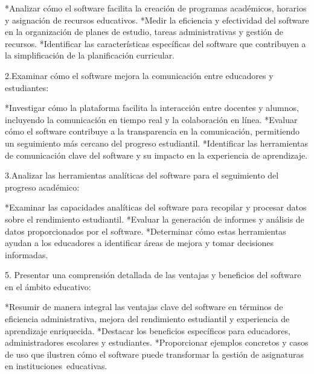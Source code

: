 *Analizar cómo el software facilita la creación de programas académicos, horarios y asignación de recursos educativos.
*Medir la eficiencia y efectividad del software en la organización de planes de estudio, tareas administrativas y gestión de recursos.
*Identificar las características específicas del software que contribuyen a la simplificación de la planificación curricular.

2.Examinar cómo el software mejora la comunicación entre educadores y estudiantes:

*Investigar cómo la plataforma facilita la interacción entre docentes y alumnos, incluyendo la comunicación en tiempo real y la colaboración en línea.
*Evaluar cómo el software contribuye a la transparencia en la comunicación, permitiendo un seguimiento más cercano del progreso estudiantil.
*Identificar las herramientas de comunicación clave del software y su impacto en la experiencia de aprendizaje.

3.Analizar las herramientas analíticas del software para el seguimiento del progreso académico:

*Examinar las capacidades analíticas del software para recopilar y procesar datos sobre el rendimiento estudiantil.
*Evaluar la generación de informes y análisis de datos proporcionados por el software.
*Determinar cómo estas herramientas ayudan a los educadores a identificar áreas de mejora y tomar decisiones informadas.

5. Presentar una comprensión detallada de las ventajas y beneficios del software en el ámbito educativo:

*Resumir de manera integral las ventajas clave del software en términos de eficiencia administrativa, mejora del rendimiento estudiantil
y experiencia de aprendizaje enriquecida.
*Destacar los beneficios específicos para educadores, administradores escolares y estudiantes.
*Proporcionar ejemplos concretos y casos de uso que ilustren cómo el software puede transformar la gestión de asignaturas en
instituciones educativas.
